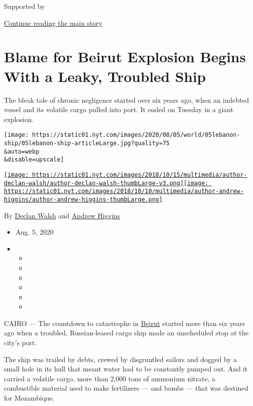 Supported by

\protect\hyperlink{after-sponsor}{Continue reading the main story}

\hypertarget{blame-for-beirut-explosion-begins-with-a-leaky-troubled-ship}{%
\section{Blame for Beirut Explosion Begins With a Leaky, Troubled
Ship}\label{blame-for-beirut-explosion-begins-with-a-leaky-troubled-ship}}

The bleak tale of chronic negligence started over six years ago, when an
indebted vessel and its volatile cargo pulled into port. It ended on
Tuesday in a giant explosion.

\texttt{[image: https://static01.nyt.com/images/2020/08/05/world/05lebanon-ship/05lebanon-ship-articleLarge.jpg?quality=75\\\&auto=webp\\\&disable=upscale]}

\href{https://www.nytimes.com/by/declan-walsh}{\texttt{[image: https://static01.nyt.com/images/2018/10/15/multimedia/author-declan-walsh/author-declan-walsh-thumbLarge-v3.png]}}\href{https://www.nytimes.com/by/andrew-higgins}{\texttt{[image: https://static01.nyt.com/images/2018/10/10/multimedia/author-andrew-higgins/author-andrew-higgins-thumbLarge.png]}}

By \href{https://www.nytimes.com/by/declan-walsh}{Declan Walsh} and
\href{https://www.nytimes.com/by/andrew-higgins}{Andrew Higgins}

\begin{itemize}
\item
  Aug. 5, 2020
\item
  \begin{itemize}
  \item
  \item
  \item
  \item
  \item
  \item
  \end{itemize}
\end{itemize}

CAIRO --- The countdown to catastrophe in
\href{https://www.nytimes.com/2020/08/06/world/middleeast/beirut-explosion-bride-video.html}{Beirut}
started more than six years ago when a troubled, Russian-leased cargo
ship made an unscheduled stop at the city's port.

The ship was trailed by debts, crewed by disgruntled sailors and dogged
by a small hole in its hull that meant water had to be constantly pumped
out. And it carried a volatile cargo, more than 2,000 tons of ammonium
nitrate, a combustible material used to make fertilizers --- and bombs
--- that was destined for Mozambique.

